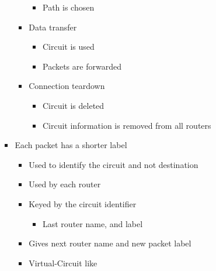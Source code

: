 \begin{itemize}
\begin{itemize}
\begin{itemize}
\begin{itemize}
\begin{itemize}
                                    \item Path is chosen
                                \end{itemize}
                            \item Data transfer
                                \begin{itemize}
                                    \item Circuit is used
                                    \item Packets are forwarded
                                \end{itemize}
                            \item Connection teardown
                                \begin{itemize}
                                    \item Circuit is deleted
                                    \item Circuit information is removed from all routers
                                \end{itemize}
                        \end{itemize}
                    \item Each packet has a shorter label
                        \begin{itemize}
                            \item Used to identify the circuit and not destination
                        \end{itemize}
                        \begin{itemize}
                            \item Used by each router
                            \item Keyed by the circuit identifier
                                \begin{itemize}
                                    \item Last router name, and label
                                \end{itemize}
                            \item Gives next router name and new packet label
                        \end{itemize}
                        \begin{itemize}
                            \item Virtual-Circuit like

\end{itemize}
\end{itemize}
\end{itemize}
\end{itemize}
